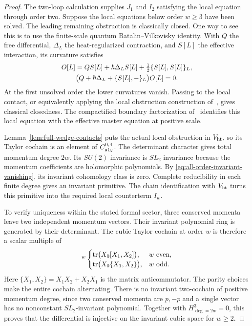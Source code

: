 \begin{proof}
The two-loop calculation supplies $J_1$ and $I_2$ satisfying the local
equation through order two.  Suppose the local equations below order
$w\ge3$ have been solved.  The leading remaining obstruction is
classically closed.  One way to see this is to use the finite-scale
quantum Batalin--Vilkovisky identity.  With $Q$ the free differential,
$\Delta_L$ the heat-regularized contraction, and $S[L]$ the effective
interaction, its curvature satisfies
\begin{gather}
 O[L]=QS[L]+\hbar\Delta_LS[L]
                  +\tfrac12\{S[L],S[L]\}_L,\notag\\
 \bigl(Q+\hbar\Delta_L+\{S[L],-\}_L\bigr)O[L]=0.
 \label{eq:finite-scale-bianchi}
\end{gather}
At the first unsolved order the lower curvatures vanish.  Passing to
the local contact, or equivalently applying the local obstruction
construction of~\cite{CostelloBV}, gives classical closedness.
The compactified boundary factorization of~\cite[Proposition
3.22]{WW} identifies this local equation with the effective master
equation at positive scale.

Lemma~\ref{lem:full-wedge-contacts} puts the actual local obstruction
in $V_{\mathrm{ht}}$, so its Taylor cochain is an element of
$C^{0,4}_{\mathfrak{sl}_N}$.  The determinant character gives total momentum
degree $2w$.  Its $SU(2)$ invariance is $SL_2$ invariance because the
momentum coefficients are holomorphic polynomials.  By
\eqref{eq:all-order-invariant-vanishing}, its invariant cohomology
class is zero.  Complete reducibility in each finite degree gives
an invariant primitive.  The chain identification with $V_{\mathrm{ht}}$
turns this primitive into the required local counterterm $I_w$.

To verify uniqueness within the stated formal sector, three
conserved momenta leave two independent momentum vectors.
Their invariant polynomial ring is generated by their determinant.
The cubic Taylor cochain at order $w$ is therefore a scalar multiple
of
\begin{equation}
 [p_0p_1]^w
 \begin{cases}
  \tr\bigl(X_0[X_1,X_2]\bigr),&w\text{ even},\\
  \tr\bigl(X_0\{X_1,X_2\}\bigr),&w\text{ odd}.
 \end{cases}
 \label{eq:all-order-cubic-shape}
\end{equation}
Here $\{X_1,X_2\}=X_1X_2+X_2X_1$ is the matrix anticommutator.
The parity choices make the entire cochain alternating.  There is
no invariant two-cochain of positive momentum degree, since two
conserved momenta are $p,-p$ and a single vector has no
nonconstant $SL_2$-invariant polynomial.  Together with
$H^3_{\deg=2w}=0$, this proves that the differential is injective
on the invariant cubic space for $w\ge2$.


\end{proof}
